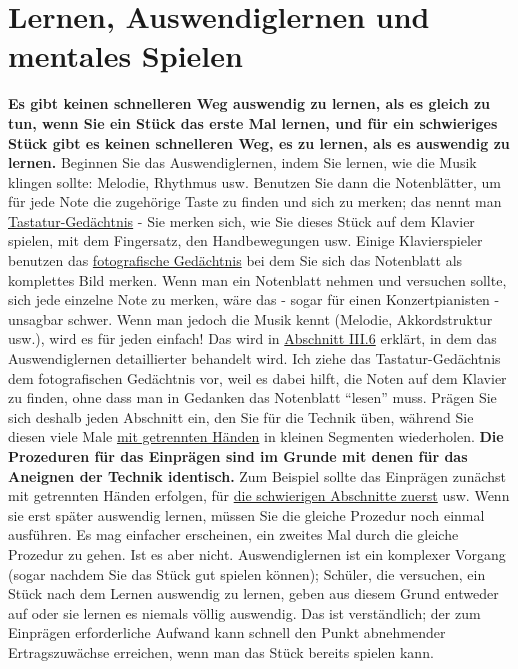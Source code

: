 
\hypertarget{c1ii12}{}


\section{Lernen, Auswendiglernen und mentales Spielen}

\textbf{Es gibt keinen schnelleren Weg auswendig zu lernen, als es gleich zu tun, wenn Sie ein Stück das erste Mal lernen, und für ein schwieriges Stück gibt es keinen schnelleren Weg, es zu lernen, als es auswendig zu lernen.}
Beginnen Sie das Auswendiglernen, indem Sie lernen, wie die Musik klingen sollte: Melodie, Rhythmus usw.
Benutzen Sie dann die Notenblätter, um für jede Note die zugehörige Taste zu finden und sich zu merken; das nennt man \hyperlink{c1iii6tastatur}{Tastatur-Gedächtnis} - Sie merken sich, wie Sie dieses Stück auf dem Klavier spielen, mit dem Fingersatz, den Handbewegungen usw.
Einige Klavierspieler benutzen das \hyperlink{c1iii6foto}{fotografische Gedächtnis} bei dem Sie sich das Notenblatt als komplettes Bild merken.
Wenn man ein Notenblatt nehmen und versuchen sollte, sich jede einzelne Note zu merken, wäre das - sogar für einen Konzertpianisten - unsagbar schwer.
Wenn man jedoch die Musik kennt (Melodie, Akkordstruktur usw.), wird es für jeden einfach!
Das wird in \hyperlink{c1iii6}{Abschnitt III.6} erklärt, in dem das Auswendiglernen detaillierter behandelt wird.
Ich ziehe das Tastatur-Gedächtnis dem fotografischen Gedächtnis vor, weil es dabei hilft, die Noten auf dem Klavier zu finden, ohne dass man in Gedanken das Notenblatt \enquote{lesen} muss.
Prägen Sie sich deshalb jeden Abschnitt ein, den Sie für die Technik üben, während Sie diesen viele Male \hyperlink{c1ii7}{mit getrennten Händen} in kleinen Segmenten wiederholen.
\textbf{Die Prozeduren für das Einprägen sind im Grunde mit denen für das Aneignen der Technik identisch.}
Zum Beispiel sollte das Einprägen zunächst mit getrennten Händen erfolgen, für \hyperlink{c1ii5}{die schwierigen Abschnitte zuerst} usw.
Wenn sie erst später auswendig lernen, müssen Sie die gleiche Prozedur noch einmal ausführen.
Es mag einfacher erscheinen, ein zweites Mal durch die gleiche Prozedur zu gehen.
Ist es aber nicht.
Auswendiglernen ist ein komplexer Vorgang (sogar nachdem Sie das Stück gut spielen können); Schüler, die versuchen, ein Stück nach dem Lernen auswendig zu lernen, geben aus diesem Grund entweder auf oder sie lernen es niemals völlig auswendig.
Das ist verständlich; der zum Einprägen erforderliche Aufwand kann schnell den Punkt abnehmender Ertragszuwächse erreichen, wenn man das Stück bereits spielen kann.

